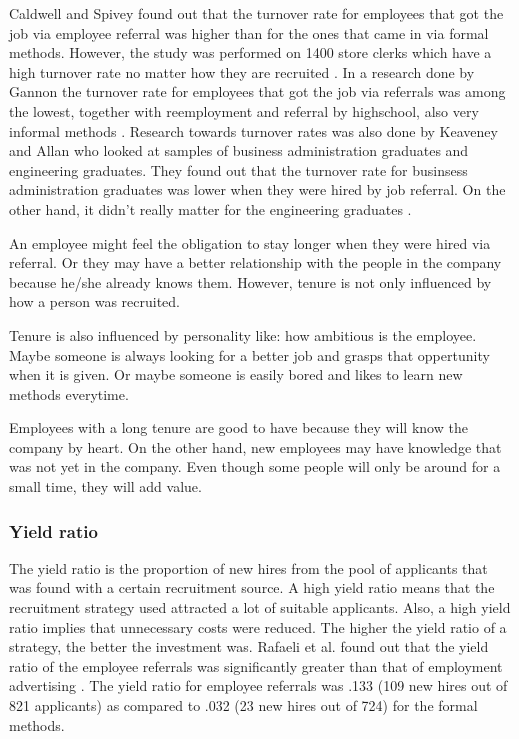 \documentclass[Main.tex]{subfiles}
\begin{document}
Caldwell and Spivey found out that the turnover rate for employees that got the job via employee referral was higher than for the ones that came in via formal methods. However, the study was performed on 1400 store clerks which have a high turnover rate no matter how they are recruited \cite{second}. In a research done by Gannon the turnover rate for employees that got the job via referrals was among the lowest, together with reemployment and referral by highschool, also very informal methods \cite{seventh}.
Research towards turnover rates was also done by Keaveney and Allan who looked at samples of business administration graduates and engineering graduates. They found out that the turnover rate for businsess administration graduates was lower when they were hired by job referral. On the other hand, it didn't really matter for the engineering graduates \cite{eleventh}.

An employee might feel the obligation to stay longer when they were hired via referral. Or they may have a better relationship with the people in the company because he/she already knows them. However, tenure is not only influenced by how a person was recruited. 

Tenure is also influenced by personality like: how ambitious is the employee. Maybe someone is always looking for a better job and grasps that oppertunity when it is given. Or maybe someone is easily bored and likes to learn new methods everytime.

Employees with a long tenure are good to have because they will know the company by heart. On the other hand, new employees may have knowledge that was not yet in the company. Even though some people will only be around for a small time, they will add value. 

\subsubsection*{Yield ratio}
The yield ratio is the proportion of new hires from the pool of applicants that was found with a certain recruitment source. A high yield ratio means that the recruitment strategy used attracted a lot of suitable applicants. Also, a high yield ratio implies that unnecessary costs were reduced. The higher the yield ratio of a strategy, the better the investment was. 
Rafaeli et al. found out that the yield ratio of the employee referrals was significantly greater than that of employment advertising \cite{fourth}. The yield ratio for employee referrals was .133 (109 new
hires out of 821 applicants) as compared to .032 (23 new hires out of 724) for the formal methods. 
\end{document}
